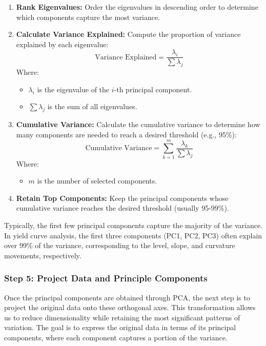 \documentclass[12pt]{article}
\begin{document}
\begin{enumerate}
    \item \textbf{Rank Eigenvalues:} Order the eigenvalues in descending order to determine which components capture the most variance.
    \item \textbf{Calculate Variance Explained:} Compute the proportion of variance explained by each eigenvalue:
    \[
    \text{Variance Explained} = \frac{\lambda_i}{\sum \lambda_j}
    \]
    Where:
    \begin{itemize}
        \item \(\lambda_i\) is the eigenvalue of the \(i\)-th principal component.
        \item \(\sum \lambda_j\) is the sum of all eigenvalues.
    \end{itemize}
    \item \textbf{Cumulative Variance:} Calculate the cumulative variance to determine how many components are needed to reach a desired threshold (e.g., 95\%):
    \[
    \text{Cumulative Variance} = \sum_{k=1}^{m} \frac{\lambda_k}{\sum \lambda_j}
    \]
    Where:
    \begin{itemize}
        \item \(m\) is the number of selected components.
    \end{itemize}
    \item \textbf{Retain Top Components:} Keep the principal components whose cumulative variance reaches the desired threshold (usually 95-99\%).
\end{enumerate}

Typically, the first few principal components capture the majority of the variance. In yield curve analysis, the first three components (PC1, PC2, PC3) often explain over 99\% of the variance, corresponding to the level, slope, and curvature movements, respectively.

\subsubsection{Step 5: Project Data and Principle Components}
Once the principal components are obtained through PCA, the next step is to project the original data onto these orthogonal axes. This transformation allows us to reduce dimensionality while retaining the most significant patterns of variation. The goal is to express the original data in terms of its principal components, where each component captures a portion of the variance. \\
\end{document}
